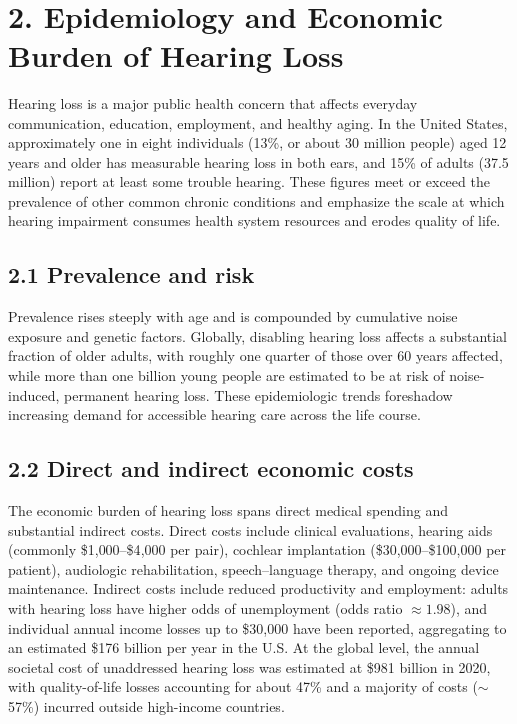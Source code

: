\
\section*{2. Epidemiology and Economic Burden of Hearing Loss}
Hearing loss is a major public health concern that affects everyday communication, education, employment, and healthy aging. In the United States, approximately one in eight individuals (13\%, or about 30 million people) aged 12 years and older has measurable hearing loss in both ears, and 15\% of adults (37.5 million) report at least some trouble hearing.\cite{nidcd2021, cdc2010, cdc2021, wilson2014} These figures meet or exceed the prevalence of other common chronic conditions and emphasize the scale at which hearing impairment consumes health system resources and erodes quality of life.

\subsection*{2.1 Prevalence and risk}
Prevalence rises steeply with age and is compounded by cumulative noise exposure and genetic factors. Globally, disabling hearing loss affects a substantial fraction of older adults, with roughly one quarter of those over 60 years affected, while more than one billion young people are estimated to be at risk of noise-induced, permanent hearing loss.\cite{WHO2025} These epidemiologic trends foreshadow increasing demand for accessible hearing care across the life course.

\subsection*{2.2 Direct and indirect economic costs}
The economic burden of hearing loss spans direct medical spending and substantial indirect costs. Direct costs include clinical evaluations, hearing aids (commonly \$1{,}000--\$4{,}000 per pair), cochlear implantation (\$30{,}000--\$100{,}000 per patient), audiologic rehabilitation, speech--language therapy, and ongoing device maintenance. Indirect costs include reduced productivity and employment: adults with hearing loss have higher odds of unemployment (odds ratio \(\approx 1.98\)), and individual annual income losses up to \$30{,}000 have been reported, aggregating to an estimated \$176 billion per year in the U.S.\cite{SocietyCosts2000, Kim2020, Colburn2019, WHO2025} At the global level, the annual societal cost of unaddressed hearing loss was estimated at \$981 billion in 2020, with quality-of-life losses accounting for about 47\% and a majority of costs (\(\sim\)57\%) incurred outside high-income countries.\cite{McDaid2021}

